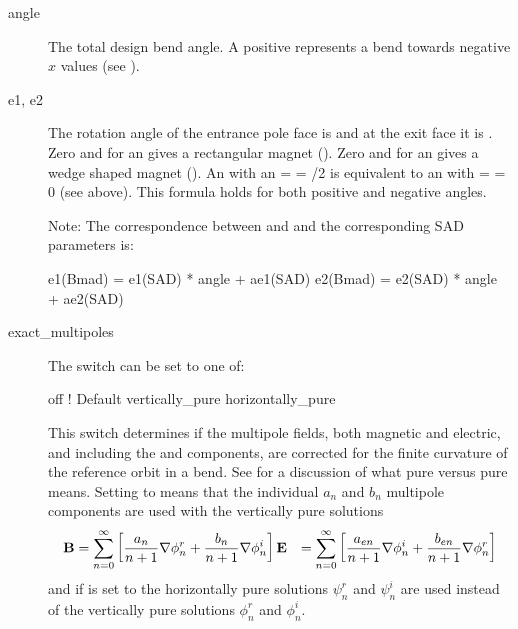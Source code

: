   \begin{description}
  \item[angle] \Newline
The total design bend angle. A positive  represents a
bend towards negative $x$ values (see ).
  \item[e1, e2] \Newline
The rotation angle of the entrance pole face is  and at the exit face it is
. Zero  and  for an  gives a rectangular magnet
(). Zero  and  for an  gives a wedge shaped magnet
().  An  with an  =  = /2 is equivalent to
an  with  =  = 0 (see above).  This formula holds for both
positive and negative angles.

Note: The correspondence between  and  and the
corresponding SAD parameters is:
\begin{example}
  e1(Bmad) =  e1(SAD) * angle + ae1(SAD)
  e2(Bmad) =  e2(SAD) * angle + ae2(SAD)
\end{example}
  \item[exact_multipoles] \Newline
The  switch can be set to one of:
\begin{example}
  off                 ! Default
  vertically_pure    
  horizontally_pure  
\end{example}
This switch determines if the multipole fields, both magnetic and electric, and including
the  and  components, are corrected for the finite curvature of the
reference orbit in a bend. See  for a discussion of what
 pure versus  pure means. Setting  to
 means that the individual $a_n$ and $b_n$ multipole components are
used with the vertically pure solutions
\begin{align}
  {\bf B} &= \sum_{n = 0}^\infty \left[ \frac{a_n}{n+1} \nabla \phi_n^r + \frac{b_n}{n+1} \nabla \phi_n^i \right] \nonumber
  {\bf E} &= \sum_{n = 0}^\infty \left[ \frac{a_{en}}{n+1} \nabla \phi_n^i + \frac{b_{en}}{n+1} \nabla \phi_n^r \right]
\end{align}
and if  is set to  the horizontally pure solutions
$\psi_n^r$ and $\psi_n^i$ are used instead of the vertically pure solutions $\phi_n^r$ and
$\phi_n^i$.


\end{description}
